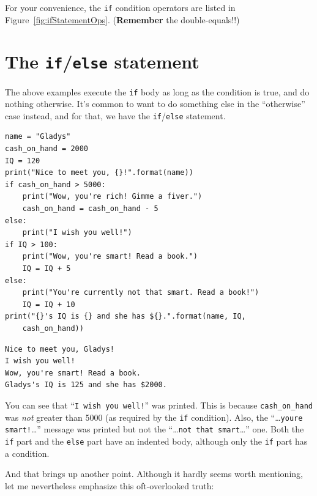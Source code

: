 
For your convenience, the \texttt{if} condition operators are listed in
Figure~\ref{fig:ifStatementOps}. (\textbf{Remember} the double-equals!!)


\section{The \texttt{if}/\texttt{else} statement}


The above examples execute the \texttt{if} body as long as the condition is
true, and do nothing otherwise. It's common to want to do something else in the
``otherwise'' case instead, and for that, we have the \texttt{if}/\texttt{else}
statement.

\begin{Verbatim}[fontsize=\footnotesize,samepage=true,frame=single,framesep=3mm]
name = "Gladys"
cash_on_hand = 2000
IQ = 120
print("Nice to meet you, {}!".format(name))
if cash_on_hand > 5000:
    print("Wow, you're rich! Gimme a fiver.")
    cash_on_hand = cash_on_hand - 5
else:
    print("I wish you well!")
if IQ > 100:
    print("Wow, you're smart! Read a book.")
    IQ = IQ + 5
else:
    print("You're currently not that smart. Read a book!")
    IQ = IQ + 10
print("{}'s IQ is {} and she has ${}.".format(name, IQ,
    cash_on_hand))
\end{Verbatim}
\vspace{-.2in}

\begin{Verbatim}[fontsize=\small,samepage=true,frame=leftline,framesep=5mm,framerule=1mm]
Nice to meet you, Gladys!
I wish you well!
Wow, you're smart! Read a book.
Gladys's IQ is 125 and she has $2000.
\end{Verbatim}

You can see that ``\texttt{I wish you well!}'' was printed. This is because
\texttt{cash\_on\_hand} was \textit{not} greater than 5000 (as required by the
\texttt{if} condition). Also, the ``\dots\texttt{you\textquotesingle{}re smart!}\dots''
message was printed but not the ``\dots\texttt{not that smart}\dots'' one.
Both the \texttt{if} part and the \texttt{else} part have an indented body,
although only the \texttt{if} part has a condition.

And that brings up another point. Although it hardly seems worth mentioning,
let me nevertheless emphasize this oft-overlooked truth:


